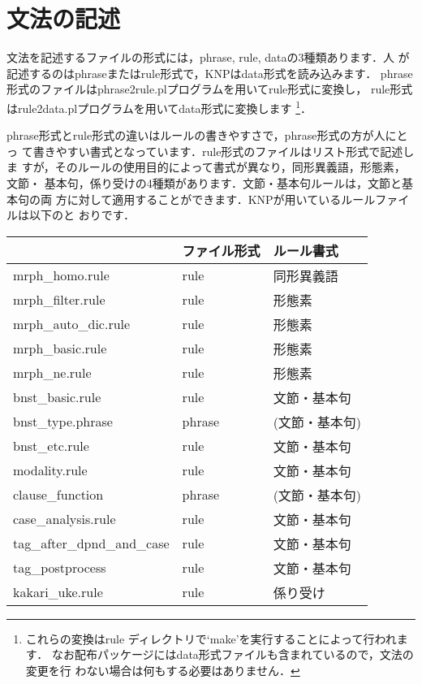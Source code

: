 \documentclass[a4j,11pt,titlepage]{jarticle}
\begin{document}
\section{文法の記述}

文法を記述するファイルの形式には，phrase, rule, dataの3種類あります．人
が記述するのはphraseまたはrule形式で，KNPはdata形式を読み込みます．
phrase形式のファイルはphrase2rule.plプログラムを用いてrule形式に変換し，
rule形式はrule2data.plプログラムを用いてdata形式に変換します
\footnote{
これらの変換はrule ディレクトリで`make'を実行することによって行われます．
なお配布パッケージにはdata形式ファイルも含まれているので，文法の変更を行
わない場合は何もする必要はありません．}．

phrase形式とrule形式の違いはルールの書きやすさで，phrase形式の方が人にとっ
て書きやすい書式となっています．rule形式のファイルはリスト形式で記述しま
すが，そのルールの使用目的によって書式が異なり，同形異義語，形態素，文節・
基本句，係り受けの4種類があります．文節・基本句ルールは，文節と基本句の両
方に対して適用することができます．KNPが用いているルールファイルは以下のと
おりです．

\begin{center}
 \begin{tabular}{l|l|l} \hline
  & ファイル形式 & ルール書式 \\ \hline
  mrph\_homo.rule   & rule & 同形異義語 \\
  mrph\_filter.rule & rule & 形態素 \\
  mrph\_auto\_dic.rule & rule & 形態素 \\
  mrph\_basic.rule  & rule & 形態素 \\
  mrph\_ne.rule     & rule & 形態素 \\
  bnst\_basic.rule  & rule & 文節・基本句 \\
  bnst\_type.phrase & phrase & (文節・基本句) \\
  bnst\_etc.rule    & rule & 文節・基本句 \\
  modality.rule     & rule & 文節・基本句 \\
  clause\_function  & phrase & (文節・基本句) \\
  case\_analysis.rule & rule & 文節・基本句 \\
  tag\_after\_dpnd\_and\_case & rule & 文節・基本句 \\
  tag\_postprocess & rule & 文節・基本句 \\
  kakari\_uke.rule  & rule & 係り受け \\ \hline
 \end{tabular}
\end{center}
\end{document}
